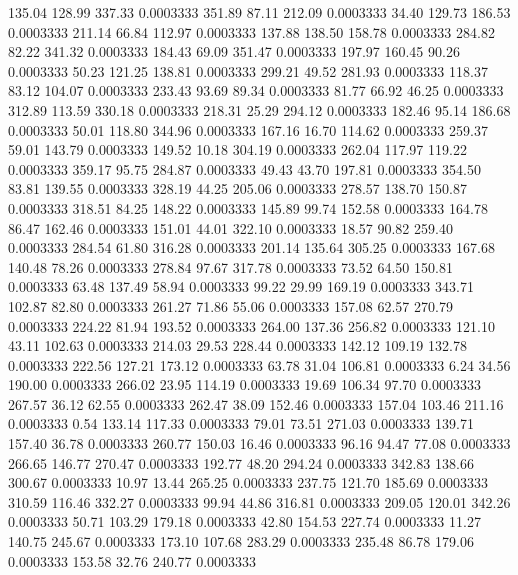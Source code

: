  135.04  128.99  337.33   0.0003333
 351.89   87.11  212.09   0.0003333
  34.40  129.73  186.53   0.0003333
 211.14   66.84  112.97   0.0003333
 137.88  138.50  158.78   0.0003333
 284.82   82.22  341.32   0.0003333
 184.43   69.09  351.47   0.0003333
 197.97  160.45   90.26   0.0003333
  50.23  121.25  138.81   0.0003333
 299.21   49.52  281.93   0.0003333
 118.37   83.12  104.07   0.0003333
 233.43   93.69   89.34   0.0003333
  81.77   66.92   46.25   0.0003333
 312.89  113.59  330.18   0.0003333
 218.31   25.29  294.12   0.0003333
 182.46   95.14  186.68   0.0003333
  50.01  118.80  344.96   0.0003333
 167.16   16.70  114.62   0.0003333
 259.37   59.01  143.79   0.0003333
 149.52   10.18  304.19   0.0003333
 262.04  117.97  119.22   0.0003333
 359.17   95.75  284.87   0.0003333
  49.43   43.70  197.81   0.0003333
 354.50   83.81  139.55   0.0003333
 328.19   44.25  205.06   0.0003333
 278.57  138.70  150.87   0.0003333
 318.51   84.25  148.22   0.0003333
 145.89   99.74  152.58   0.0003333
 164.78   86.47  162.46   0.0003333
 151.01   44.01  322.10   0.0003333
  18.57   90.82  259.40   0.0003333
 284.54   61.80  316.28   0.0003333
 201.14  135.64  305.25   0.0003333
 167.68  140.48   78.26   0.0003333
 278.84   97.67  317.78   0.0003333
  73.52   64.50  150.81   0.0003333
  63.48  137.49   58.94   0.0003333
  99.22   29.99  169.19   0.0003333
 343.71  102.87   82.80   0.0003333
 261.27   71.86   55.06   0.0003333
 157.08   62.57  270.79   0.0003333
 224.22   81.94  193.52   0.0003333
 264.00  137.36  256.82   0.0003333
 121.10   43.11  102.63   0.0003333
 214.03   29.53  228.44   0.0003333
 142.12  109.19  132.78   0.0003333
 222.56  127.21  173.12   0.0003333
  63.78   31.04  106.81   0.0003333
   6.24   34.56  190.00   0.0003333
 266.02   23.95  114.19   0.0003333
  19.69  106.34   97.70   0.0003333
 267.57   36.12   62.55   0.0003333
 262.47   38.09  152.46   0.0003333
 157.04  103.46  211.16   0.0003333
   0.54  133.14  117.33   0.0003333
  79.01   73.51  271.03   0.0003333
 139.71  157.40   36.78   0.0003333
 260.77  150.03   16.46   0.0003333
  96.16   94.47   77.08   0.0003333
 266.65  146.77  270.47   0.0003333
 192.77   48.20  294.24   0.0003333
 342.83  138.66  300.67   0.0003333
  10.97   13.44  265.25   0.0003333
 237.75  121.70  185.69   0.0003333
 310.59  116.46  332.27   0.0003333
  99.94   44.86  316.81   0.0003333
 209.05  120.01  342.26   0.0003333
  50.71  103.29  179.18   0.0003333
  42.80  154.53  227.74   0.0003333
  11.27  140.75  245.67   0.0003333
 173.10  107.68  283.29   0.0003333
 235.48   86.78  179.06   0.0003333
 153.58   32.76  240.77   0.0003333
